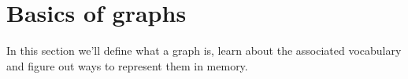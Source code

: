 \section{Basics of graphs}

In this section we'll define what a graph is,
learn about the associated vocabulary
and figure out ways to represent them in memory.




